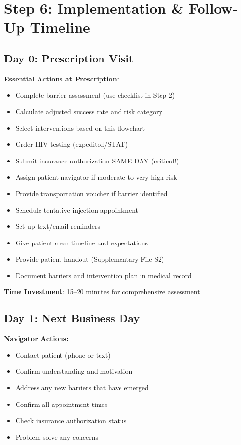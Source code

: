 \documentclass[11pt]{article}
\begin{document}
\section{Step 6: Implementation \& Follow-Up Timeline}

\subsection{Day 0: Prescription Visit}

\begin{tcolorbox}[colback=blue!5!white,colframe=blue!75!black,breakable]
\textbf{Essential Actions at Prescription:}

\begin{itemize}[label=$\square$,leftmargin=*]
\item Complete barrier assessment (use checklist in Step 2)
\item Calculate adjusted success rate and risk category
\item Select interventions based on this flowchart
\item Order HIV testing (expedited/STAT)
\item Submit insurance authorization SAME DAY (critical!)
\item Assign patient navigator if moderate to very high risk
\item Provide transportation voucher if barrier identified
\item Schedule tentative injection appointment
\item Set up text/email reminders
\item Give patient clear timeline and expectations
\item Provide patient handout (Supplementary File S2)
\item Document barriers and intervention plan in medical record
\end{itemize}

\textbf{Time Investment}: 15--20 minutes for comprehensive assessment
\end{tcolorbox}

\subsection{Day 1: Next Business Day}

\begin{tcolorbox}[colback=blue!5!white,colframe=blue!75!black]
\textbf{Navigator Actions:}

\begin{itemize}[label=$\square$,leftmargin=*]
\item Contact patient (phone or text)
\item Confirm understanding and motivation
\item Address any new barriers that have emerged
\item Confirm all appointment times
\item Check insurance authorization status
\item Problem-solve any concerns
\end{itemize}
\end{tcolorbox}
\end{document}
